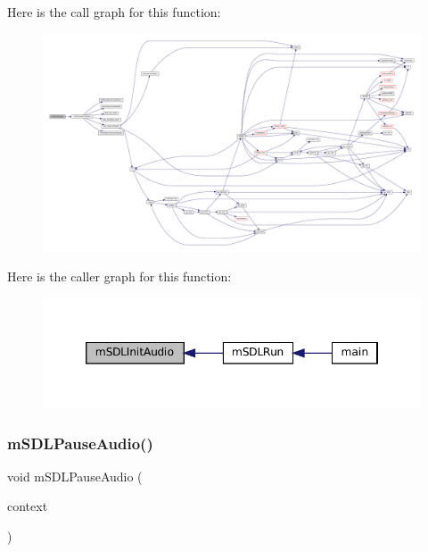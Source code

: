 Here is the call graph for this function\+:
\nopagebreak
\begin{figure}[H]
\begin{center}
\leavevmode
\includegraphics[width=350pt]{sdl-audio_8c_aa58bb1fe9aa1e3a8eaac9b81fdb4c5b6_cgraph}
\end{center}
\end{figure}
Here is the caller graph for this function\+:
\nopagebreak
\begin{figure}[H]
\begin{center}
\leavevmode
\includegraphics[width=346pt]{sdl-audio_8c_aa58bb1fe9aa1e3a8eaac9b81fdb4c5b6_icgraph}
\end{center}
\end{figure}
\mbox{\label{sdl-audio_8c_a6fd4770ab1d4825f5f3231ce155d4696}} 
\subsubsection{\texorpdfstring{m\+S\+D\+L\+Pause\+Audio()}{mSDLPauseAudio()}}
{\footnotesize\ttfamily void m\+S\+D\+L\+Pause\+Audio (\begin{DoxyParamCaption}\item[{struct \mbox{\hyperlink{sdl-audio_8h_structm_s_d_l_audio}{m\+S\+D\+L\+Audio}} $\ast$}]{context }\end{DoxyParamCaption})}

